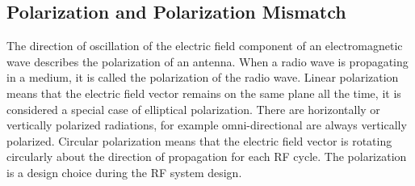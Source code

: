   


\subsection{Polarization and Polarization Mismatch} \label{sec:pol}
The direction of oscillation of the electric field component of an electromagnetic wave describes the polarization of an antenna. When a radio wave is propagating in a medium, it is called the polarization of the radio wave. Linear polarization means that the electric field vector remains on the same plane all the time, it is considered a special case of elliptical polarization. There are horizontally or vertically polarized radiations, for example omni-directional are always vertically polarized. Circular polarization means that the electric field vector is rotating circularly about the direction of propagation for each \acs{RF} cycle. The polarization is a design choice during the \acs{RF} system design. \\

